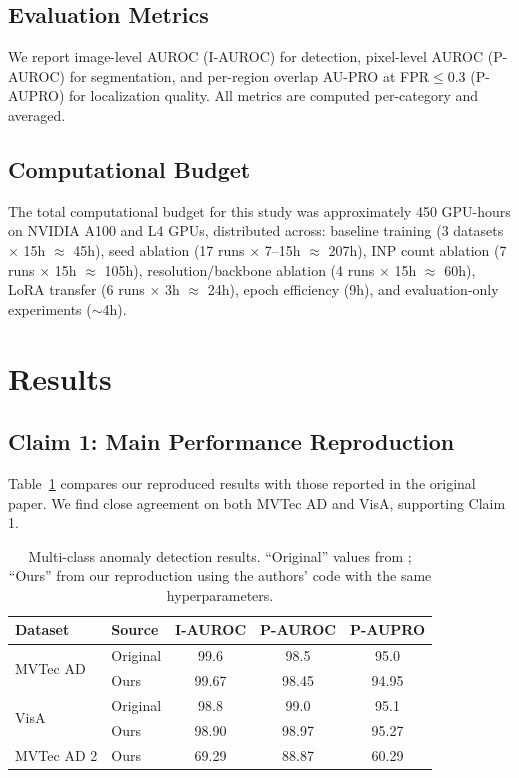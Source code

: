 \documentclass[10pt]{article} %
\begin{document}
\subsection{Evaluation Metrics}

We report image-level AUROC (I-AUROC) for detection, pixel-level AUROC (P-AUROC) for segmentation, and per-region overlap AU-PRO at FPR$\leq$0.3 (P-AUPRO) for localization quality. All metrics are computed per-category and averaged.

\subsection{Computational Budget}

The total computational budget for this study was approximately 450 GPU-hours on NVIDIA A100 and L4 GPUs, distributed across: baseline training (3 datasets $\times$ 15h $\approx$ 45h), seed ablation (17 runs $\times$ 7--15h $\approx$ 207h), INP count ablation (7 runs $\times$ 15h $\approx$ 105h), resolution/backbone ablation (4 runs $\times$ 15h $\approx$ 60h), LoRA transfer (6 runs $\times$ 3h $\approx$ 24h), epoch efficiency (9h), and evaluation-only experiments ($\sim$4h).


\section{Results}
\label{sec:results}

\subsection{Claim 1: Main Performance Reproduction}
\label{sec:results_main}

Table~\ref{tab:main_results} compares our reproduced results with those reported in the original paper. We find close agreement on both MVTec AD and VisA, supporting Claim 1.

\begin{table}[t]
\caption{Multi-class anomaly detection results. ``Original'' values from \citet{inp_former_2025}; ``Ours'' from our reproduction using the authors' code with the same hyperparameters.}
\label{tab:main_results}
\begin{center}
\begin{tabular}{llccc}
\toprule
Dataset & Source & I-AUROC & P-AUROC & P-AUPRO \\
\midrule
\multirow{2}{*}{MVTec AD} & Original & 99.6 & 98.5 & 95.0 \\
                           & Ours     & 99.67 & 98.45 & 94.95 \\
\midrule
\multirow{2}{*}{VisA}     & Original & 98.8 & 99.0 & 95.1 \\
                           & Ours     & 98.90 & 98.97 & 95.27 \\
\midrule
MVTec AD 2                 & Ours     & 69.29 & 88.87 & 60.29 \\
\bottomrule
\end{tabular}
\end{center}
\end{table}
\end{document}
